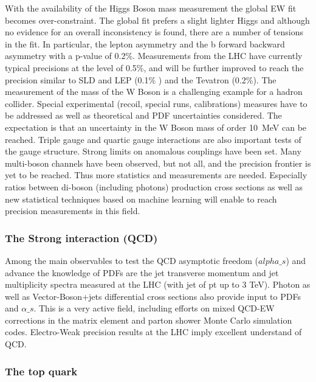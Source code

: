 \noindent With the availability of the Higgs Boson mass
measurement the global EW fit becomes over-constraint. The global fit
prefers a slight lighter Higgs and although no evidence for an overall
inconsistency is found, there are a number of tensions in the fit. In
particular, the lepton asymmetry and the b forward backward asymmetry
with a p-value of 0.2\%. Measurements from the LHC have currently
typical precisions at the level of 0.5\%, and will be further improved
to reach the precision similar to SLD and LEP (0.1\% ) and the Tevatron
(0.2\%). The measurement of the mass of the W Boson is a challenging
example for a hadron collider. Special experimental (recoil, special
runs, calibrations) measures have to be addressed as well as theoretical
and PDF uncertainties considered. The expectation is that an uncertainty
in the W Boson mass of order 10~MeV can be reached. Triple gauge and
quartic gauge interactions are also important tests of the gauge
structure. Strong limits on anomalous couplings have been set. Many
multi-boson channels have been observed, but not all, and the precision
frontier is yet to be reached. Thus more statistics and measurements are
needed. Especially ratios between di-boson (including photons)
production cross sections as well as new statistical techniques based on
machine learning will enable to reach precision measurements in this
field. 

\subsubsection*{The Strong interaction (QCD)}

\noindent Among the main observables to test
the QCD asymptotic freedom ($alpha\_s$) and advance the knowledge of PDFs
are the jet transverse momentum and jet multiplicity spectra measured at
the LHC (with jet of pt up to 3 TeV). Photon as well as
Vector-Boson+jets differential cross sections also provide input to PDFs
and $\alpha\_s$. This is a very active field, including efforts on mixed
QCD-EW corrections in the matrix element and parton shower Monte Carlo
simulation codes. Electro-Weak precision results at the LHC imply
excellent understand of QCD.

\subsubsection*{The top quark}

